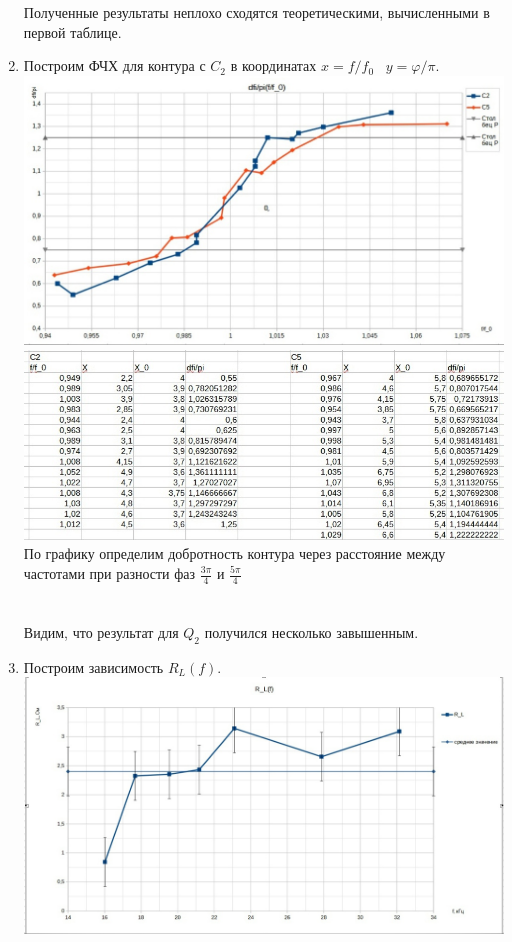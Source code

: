 \documentclass[11pt]{article}
\begin{document}
\begin{enumerate}
Полученные результаты неплохо сходятся теоретическими, вычисленными в первой таблице.\\
    \item Построим ФЧХ для контура с $C_2$ в координатах $x = f/f_0 \;\;\; y = \varphi/\pi$. \\
\includegraphics[width=18cm]{g8}\\
\includegraphics[width=16cm]{g6}\\
    По графику определим добротность контура через расстояние между частотами при разности фаз $\frac{3\pi}{4}$ и $\frac{5\pi}{4}$\\
  \\
  \\
  Видим, что результат для $Q_2$ получился несколько завышенным.\\
 \item Построим зависимость $R_L(f)$.\\
 \includegraphics[width = 18cm]{g5}\\

\end{enumerate}
\end{document}
